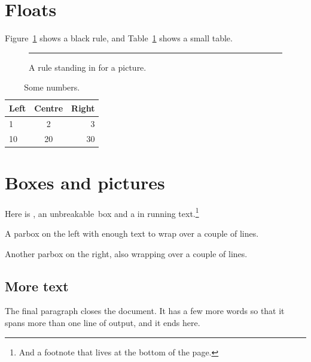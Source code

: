 \documentclass[11pt]{article}
\begin{document}
\section{Floats}
Figure~\ref{fig:rule} shows a black rule, and Table~\ref{tab:numbers}
shows a small table.

\begin{figure}[ht]
  \centering
  \rule{4cm}{2cm}
  \caption{A rule standing in for a picture.}
  \label{fig:rule}
\end{figure}

\begin{table}[ht]
  \centering
  \begin{tabular}{|l|c|r|}
    \hline
    Left & Centre & Right \\
    \hline
    1 & 2 & 3 \\
    10 & 20 & 30 \\
    \hline
  \end{tabular}
  \caption{Some numbers.}
  \label{tab:numbers}
\end{table}

\section{Boxes and pictures}
Here is , an \mbox{unbreakable box} and a
 in running text.\footnote{And a footnote
that lives at the bottom of the page.}

\begin{center}
\end{center}

\noindent\parbox{0.45\textwidth}{A parbox on the left with enough
text to wrap over a couple of lines.}\hfill
\parbox{0.45\textwidth}{Another parbox on the right, also wrapping
over a couple of lines.}

\subsection{More text}
The final paragraph closes the document. It has a few more words so
that it spans more than one line of output, and it ends here.
\end{document}
